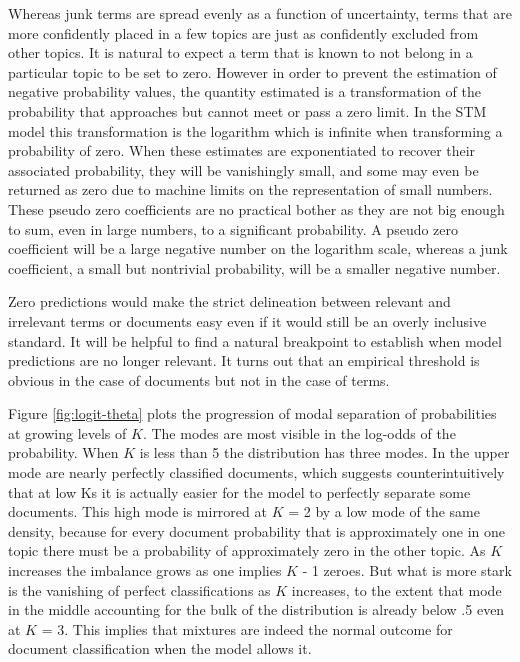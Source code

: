 \documentclass[]{book}
\theoremstyle{definition}
\theoremstyle{definition}
\theoremstyle{definition}
\theoremstyle{remark}
\begin{document}
Whereas junk terms are spread evenly as a function of uncertainty, terms
that are more confidently placed in a few topics are just as confidently
excluded from other topics. It is natural to expect a term that is known
to not belong in a particular topic to be set to zero. However in order
to prevent the estimation of negative probability values, the quantity
estimated is a transformation of the probability that approaches but
cannot meet or pass a zero limit. In the STM model this transformation
is the logarithm which is infinite when transforming a probability of
zero. When these estimates are exponentiated to recover their associated
probability, they will be vanishingly small, and some may even be
returned as zero due to machine limits on the representation of small
numbers. These pseudo zero coefficients are no practical bother as they
are not big enough to sum, even in large numbers, to a significant
probability. A pseudo zero coefficient will be a large negative number
on the logarithm scale, whereas a junk coefficient, a small but
nontrivial probability, will be a smaller negative number.

Zero predictions would make the strict delineation between relevant and
irrelevant terms or documents easy even if it would still be an overly
inclusive standard. It will be helpful to find a natural breakpoint to
establish when model predictions are no longer relevant. It turns out
that an empirical threshold is obvious in the case of documents but not
in the case of terms.

Figure \ref{fig:logit-theta} plots the progression of modal separation
of probabilities at growing levels of \(K\). The modes are most visible
in the log-odds of the probability. When \(K\) is less than 5 the
distribution has three modes. In the upper mode are nearly perfectly
classified documents, which suggests counterintuitively that at low Ks
it is actually easier for the model to perfectly separate some
documents. This high mode is mirrored at \(K\) = 2 by a low mode of the
same density, because for every document probability that is
approximately one in one topic there must be a probability of
approximately zero in the other topic. As \(K\) increases the imbalance
grows as one implies \(K\) - 1 zeroes. But what is more stark is the
vanishing of perfect classifications as \(K\) increases, to the extent
that mode in the middle accounting for the bulk of the distribution is
already below .5 even at \(K\) = 3. This implies that mixtures are
indeed the normal outcome for document classification when the model
allows it.
\end{document}
